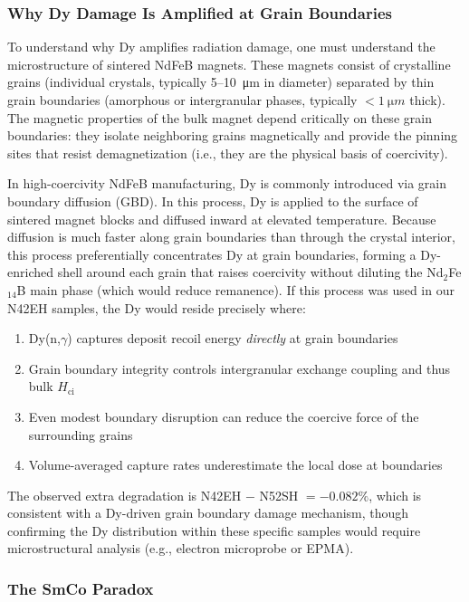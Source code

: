 \documentclass[11pt,letterpaper]{article}
\newcommand{\Hci}{H_\mathrm{ci}}
\begin{document}
\subsubsection{Why Dy Damage Is Amplified at Grain Boundaries}

To understand why Dy amplifies radiation damage, one must understand the
microstructure of sintered NdFeB magnets. These magnets consist of
crystalline grains (individual crystals, typically 5--\SI{10}{\micro m} in
diameter) separated by thin grain boundaries (amorphous or intergranular
phases, typically $<\SI{1}{\micro m}$ thick). The magnetic properties of the
bulk magnet depend critically on these grain boundaries: they isolate
neighboring grains magnetically and provide the pinning sites that resist
demagnetization (i.e., they are the physical basis of coercivity).

In high-coercivity NdFeB manufacturing, Dy is commonly introduced via grain
boundary diffusion (GBD). In this process, Dy is applied to the surface of
sintered magnet blocks and diffused inward at elevated temperature. Because
diffusion is much faster along grain boundaries than through the crystal
interior, this process preferentially concentrates Dy at grain boundaries,
forming a Dy-enriched shell around each grain that raises coercivity without
diluting the Nd$_2$Fe$_{14}$B main phase (which would reduce remanence). If
this process was used in our N42EH samples, the Dy would reside precisely
where:
\begin{enumerate}
    \item Dy(n,$\gamma$) captures deposit recoil energy \emph{directly} at
    grain boundaries
    \item Grain boundary integrity controls intergranular exchange coupling
    and thus bulk $\Hci$
    \item Even modest boundary disruption can reduce the coercive force of
    the surrounding grains
    \item Volume-averaged capture rates underestimate the local dose at
    boundaries
\end{enumerate}

The observed extra degradation is N42EH $-$ N52SH $= -0.082\%$, which is
consistent with a Dy-driven grain boundary damage mechanism, though
confirming the Dy distribution within these specific samples would require
microstructural analysis (e.g., electron microprobe or EPMA).

\subsubsection{The SmCo Paradox}
\end{document}
